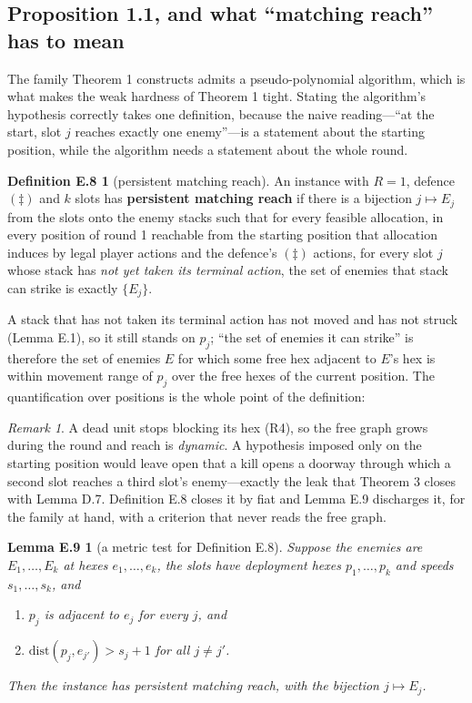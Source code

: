 \documentclass[11pt,a4paper]{article}
\theoremstyle{plain}
\newtheorem*{lemEtest}{Lemma E.9}
\theoremstyle{definition}
\newtheorem*{defEmatch}{Definition E.8}
\theoremstyle{plain}
\theoremstyle{definition}
\theoremstyle{remark}
\newtheorem*{remark}{Remark}
\begin{document}
\subsection*{Proposition 1.1, and what ``matching reach'' has to mean}

The family Theorem 1 constructs admits a pseudo-polynomial algorithm, which is what makes
the weak hardness of Theorem 1 tight. Stating the algorithm's hypothesis correctly takes
one definition, because the naive reading---``at the start, slot $j$ reaches exactly one
enemy''---is a statement about the starting position, while the algorithm needs a statement
about the whole round.

\begin{defEmatch}[persistent matching reach]
An instance with $R=1$, defence $(\ddagger)$ and $k$ slots has \textbf{persistent matching
reach} if there is a bijection $j\mapsto E_j$ from the slots onto the enemy stacks such that
for every feasible allocation, in every position of round 1 reachable from the starting
position that allocation induces by legal player actions
and the defence's $(\ddagger)$ actions, for every slot $j$ whose stack has \emph{not yet
taken its terminal action}, the set of enemies that stack can strike is exactly $\{E_j\}$.
\end{defEmatch}

A stack that has not taken its terminal action has not moved and has not struck (Lemma E.1),
so it still stands on $p_j$; ``the set of enemies it can strike'' is therefore the set of
enemies $E$ for which some free hex adjacent to $E$'s hex is within movement range of $p_j$
over the free hexes of the current position. The quantification over positions is the whole
point of the definition:

\begin{remark}
A dead unit stops blocking its hex (R4), so the free graph grows during the round and reach
is \emph{dynamic}. A hypothesis imposed only on the starting position would leave open that
a kill opens a doorway through which a second slot reaches a third slot's enemy---exactly the
leak that Theorem 3 closes with Lemma D.7. Definition E.8 closes it by fiat and Lemma E.9
discharges it, for the family at hand, with a criterion that never reads the free graph.
\end{remark}

\begin{lemEtest}[a metric test for Definition E.8]
Suppose the enemies are $E_1,\dots,E_k$ at hexes $e_1,\dots,e_k$, the slots have deployment
hexes $p_1,\dots,p_k$ and speeds $s_1,\dots,s_k$, and
\begin{enumerate}
\item $p_j$ is adjacent to $e_j$ for every $j$, and
\item $\mathrm{dist}(p_j,e_{j'})>s_j+1$ for all $j\ne j'$.
\end{enumerate}
Then the instance has persistent matching reach, with the bijection $j\mapsto E_j$.
\end{lemEtest}
\end{document}
